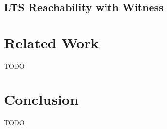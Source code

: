 \documentclass[10pt,conference]{llncs}
\begin{document}
\subsection{LTS Reachability with Witness}



\section{Related Work}
TODO



\section{Conclusion}
TODO



 




\end{document}
